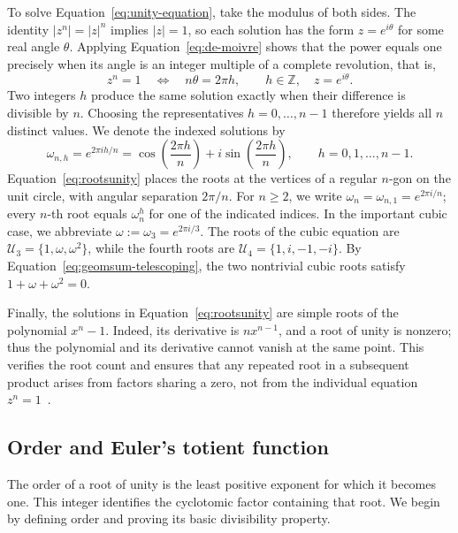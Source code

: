 \documentclass[11pt,a4paper]{article}
\numberwithin{equation}{section}
\theoremstyle{uprightpaper}
\newcommand{\Z}{\mathbb{Z}}
\begin{document}
To solve Equation~\eqref{eq:unity-equation}, take the modulus of both sides. The identity $|z^n|=|z|^n$ implies $|z|=1$, so each solution has the form $z=e^{i\theta}$ for some real angle $\theta$. Applying Equation~\eqref{eq:de-moivre} shows that the power equals one precisely when its angle is an integer multiple of a complete revolution, that is,
\begin{equation}\label{eq:unity-angles}
 z^n=1\quad\Longleftrightarrow\quad n\theta=2\pi h,
 \qquad h\in\Z,\quad z=e^{i\theta}.
\end{equation}
Two integers $h$ produce the same solution exactly when their difference is divisible by $n$. Choosing the representatives $h=0,\ldots,n-1$ therefore yields all $n$ distinct values. We denote the indexed solutions by
\begin{equation}\label{eq:rootsunity}
 \omega_{n,h}=e^{2\pi i h/n}
 =\cos\left(\frac{2\pi h}{n}\right)
 +i\sin\left(\frac{2\pi h}{n}\right),
 \qquad h=0,1,\ldots,n-1.
\end{equation}
Equation~\eqref{eq:rootsunity} places the roots at the vertices of a regular $n$-gon on the unit circle, with angular separation $2\pi/n$. For $n\geq2$, we write $\omega_n=\omega_{n,1}=e^{2\pi i/n}$; every $n$-th root equals $\omega_n^h$ for one of the indicated indices. In the important cubic case, we abbreviate $\omega:=\omega_3=e^{2\pi i/3}$. The roots of the cubic equation are $\mathcal U_3=\{1,\omega,\omega^2\}$, while the fourth roots are $\mathcal U_4 = \{1,i,-1,-i\}$. By Equation~\eqref{eq:geomsum-telescoping}, the two nontrivial cubic roots satisfy $1+\omega+\omega^2 = 0$.

Finally, the solutions in Equation~\eqref{eq:rootsunity} are simple roots of the polynomial $x^n-1$. Indeed, its derivative is $nx^{n-1}$, and a root of unity is nonzero; thus the polynomial and its derivative cannot vanish at the same point. This verifies the root count and ensures that any repeated root in a subsequent product arises from factors sharing a zero, not from the individual equation $z^n=1$~\cite{dummit2004}.

\subsection{Order and Euler's totient function}\label{subsec:order-totient}

The order of a root of unity is the least positive exponent for which it becomes one. This integer identifies the cyclotomic factor containing that root. We begin by defining order and proving its basic divisibility property.
\end{document}
